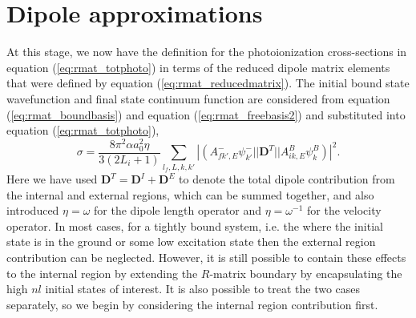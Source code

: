 \section{Dipole approximations}\label{sec:dipole}
At this stage, we now have the definition for the photoionization cross-sections in equation (\ref{eq:rmat_totphoto}) in terms of the reduced dipole matrix elements that were defined by equation (\ref{eq:rmat_reducedmatrix}). The initial bound state wavefunction and final state continuum function are considered from equation (\ref{eq:rmat_boundbasis}) and equation (\ref{eq:rmat_freebasis2}) and substituted into equation (\ref{eq:rmat_totphoto}),
\begin{equation}\label{eq:rmat_dipfirst}
\sigma = \frac{8\pi^2\alpha a_0^2\eta}{3(2L_i+1)}\sum_{l_f, L, k, k'} | (A^-_{fk',E}\psi^-_{k'} || \boldsymbol{D}^T || A^B_{ik,E}\psi^B_{k}) |^2.
\end{equation}
Here we have used $\boldsymbol{D}^T = \boldsymbol{D}^I + \boldsymbol{D}^E$ to denote the total dipole contribution from the internal and external regions, which can be summed together, and also introduced $\eta = \omega$ for the dipole length operator and $\eta = \omega^{-1}$ for the velocity operator. In most cases, for a tightly bound system, i.e. the where the initial state is in the ground or some low excitation state then the external region contribution can be neglected. However, it is still possible to contain these effects to the internal region by extending the $R$-matrix boundary by encapsulating the high $nl$ initial states of interest. It is also possible to treat the two cases separately, so we begin by considering the internal region contribution first.\\


